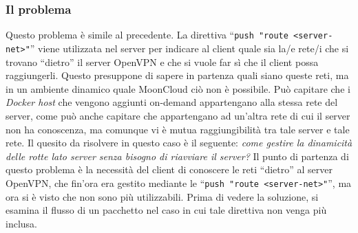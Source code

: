 \subsubsection{Il problema}
Questo problema è simile al precedente. La direttiva ``\texttt{push "route <server-net>"}''
viene utilizzata nel server per indicare al client quale sia la/e rete/i che si trovano
``dietro'' il server OpenVPN e che si vuole far sì che il client possa raggiungerli.
Questo presuppone di sapere in partenza quali siano queste reti, ma in un ambiente
dinamico quale MoonCloud ciò non è possibile. Può capitare che i \textit{Docker host}
che vengono aggiunti on-demand appartengano alla stessa rete del server, come
può anche capitare che appartengano ad un'altra rete di cui il server non ha conoscenza,
ma comunque vi è mutua raggiungibilità tra tale server e tale rete. Il quesito da
risolvere in questo caso è il seguente: \textit{come gestire la dinamicità delle rotte
lato server senza bisogno di riavviare il server?}
Il punto di partenza di questo problema è la necessità del client di conoscere le
reti ``dietro'' al server OpenVPN, che fin'ora era gestito mediante le
``\texttt{push "route <server-net>"}'', ma ora si è visto che non sono più utilizzabili.
Prima di vedere la soluzione, si esamina il flusso di un pacchetto nel caso in cui
tale direttiva non venga più inclusa.
